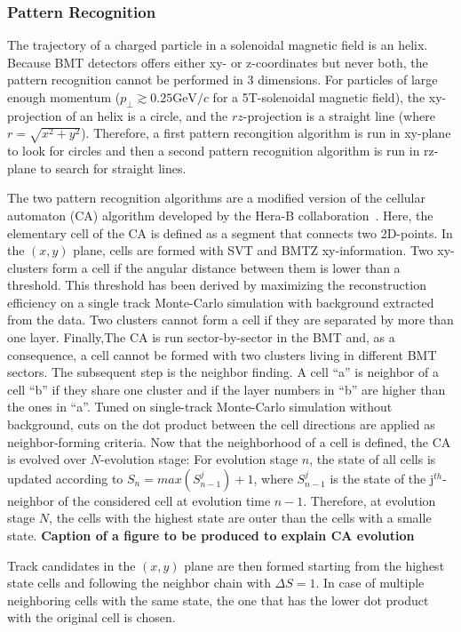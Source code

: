 \documentclass[3p,times,twocolumn]{elsarticle}
\begin{document}
\subsubsection{Pattern Recognition}
The trajectory of a charged particle in a solenoidal magnetic field is an helix. Because BMT detectors offers either
xy- or z-coordinates but never both, the pattern recognition cannot be performed in 3 dimensions. For particles of
large enough momentum ($p_\perp \gtrsim 0.25 \text{GeV}/c$ for a 5T-solenoidal magnetic field), the xy-projection of an
helix is a circle, and the $rz$-projection is a straight line (where $r = \sqrt{x^2 + y^2}$). Therefore, a first
pattern recongition algorithm is run in xy-plane to look for circles and then a second pattern recognition algorithm is
run in rz-plane to search for straight lines.

The two pattern recognition algorithms are a modified version of the cellular automaton (CA) algorithm developed by the
Hera-B collaboration~\cite{CA-HeraB}. Here, the elementary cell of the CA is defined as a segment that connects two
2D-points.
In the $(x,y)$ plane, cells are formed with SVT and BMTZ xy-information. Two xy-clusters form a cell if the angular
distance between them is lower than a threshold. This threshold has been derived by maximizing the reconstruction
efficiency on a single track Monte-Carlo simulation with background extracted from the data. Two clusters cannot form a
cell if they are separated by more than one layer. Finally,The CA is run sector-by-sector in the BMT and, as a
consequence, a cell cannot be formed with two clusters living in different BMT sectors.
The subsequent step is the neighbor finding. A cell ``a'' is neighbor of a cell ``b'' if they share one cluster and if
the layer numbers in ``b'' are higher than the ones in ``a''. Tuned on single-track Monte-Carlo simulation without
background, cuts on the dot product between the cell directions are applied  as neighbor-forming criteria.
Now that the neighborhood of a cell is defined, the CA is evolved over $N$-evolution stage: For evolution stage $n$,
the state of all cells is updated according to $S_n = max(S_{n-1}^j) + 1$, where $S_{n-1}^j$ is the state of the
j$^{th}$-neighbor of the considered cell at evolution time $n-1$. Therefore, at evolution stage $N$, the cells with the
highest state are outer than the cells with a smalle state.
\color{red} \textbf{Caption of a figure to be produced to explain CA evolution} \color{black}

Track candidates in the $(x,y)$ plane are then formed starting from the highest state cells and following the neighbor
chain with $\Delta S = 1$. In case of multiple neighboring cells with the same state, the one that has the lower dot
product with the original cell is chosen.
\end{document}

